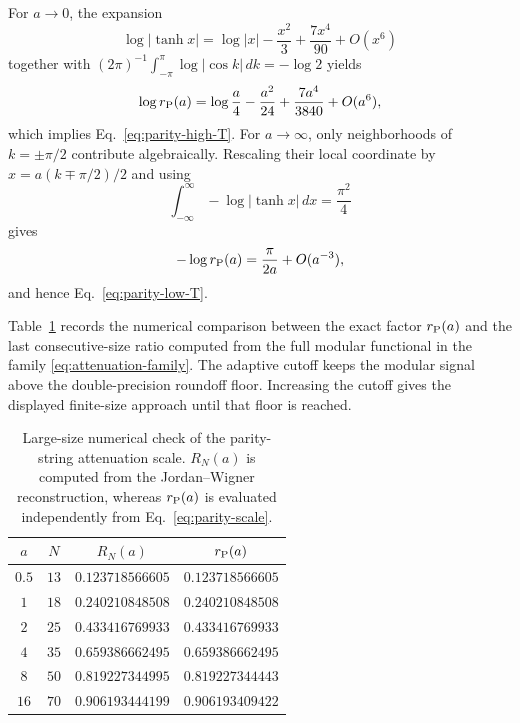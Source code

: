 \documentclass[aps,prb,preprint,nofootinbib,longbibliography]{revtex4-2}
\begin{document}
For $a\to0$, the expansion
\begin{equation}
 \log|\tanh x|
 =\log|x|-\frac{x^2}{3}+\frac{7x^4}{90}+O(x^6)
 \label{eq:log-tanh-small}
\end{equation}
together with
$(2\pi)^{-1}\int_{-\pi}^{\pi}\log|\cos k|\,dk=-\log2$ yields
\begin{equation}
 \log r_{\rm P}(a)
 =\log\frac a4-\frac{a^2}{24}
 +\frac{7a^4}{3840}+O(a^6),
 \label{eq:parity-high-T-log}
\end{equation}
which implies Eq.~\eqref{eq:parity-high-T}.  For $a\to\infty$, only
neighborhoods of $k=\pm\pi/2$ contribute algebraically.  Rescaling their
local coordinate by $x=a(k\mp\pi/2)/2$ and using
\begin{equation}
 \int_{-\infty}^{\infty}-\log|\tanh x|\,dx=\frac{\pi^2}{4}
 \label{eq:tanh-integral}
\end{equation}
gives
\begin{equation}
 -\log r_{\rm P}(a)=\frac{\pi}{2a}+O(a^{-3}),
 \label{eq:parity-low-T-log}
\end{equation}
and hence Eq.~\eqref{eq:parity-low-T}.

Table~\ref{tab:attenuation-check} records the numerical comparison between
the exact factor $r_{\rm P}(a)$ and the last consecutive-size ratio computed
from the full modular functional in the family
\eqref{eq:attenuation-family}.  The adaptive cutoff keeps the modular signal
above the double-precision roundoff floor.  Increasing the cutoff gives the
displayed finite-size approach until that floor is reached.

\begin{table}[t]
\caption{Large-size numerical check of the parity-string attenuation scale.
$R_N(a)$ is computed from the Jordan--Wigner reconstruction, whereas
$r_{\rm P}(a)$ is evaluated independently from
Eq.~\eqref{eq:parity-scale}.}
\label{tab:attenuation-check}
\begin{ruledtabular}
\begin{tabular}{cccc}
$a$ & $N$ & $R_N(a)$ & $r_{\rm P}(a)$\\
\hline
$0.5$ & $13$ & $0.123718566605$ & $0.123718566605$\\
$1$   & $18$ & $0.240210848508$ & $0.240210848508$\\
$2$   & $25$ & $0.433416769933$ & $0.433416769933$\\
$4$   & $35$ & $0.659386662495$ & $0.659386662495$\\
$8$   & $50$ & $0.819227344995$ & $0.819227344443$\\
$16$  & $70$ & $0.906193444199$ & $0.906193409422$\\
\end{tabular}
\end{ruledtabular}
\end{table}
\end{document}

